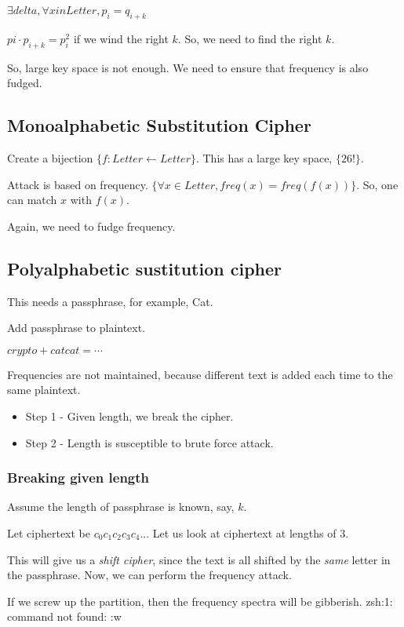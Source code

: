 ${ \exists delta, \forall x in Letter, p_i = q_{i+k} }$

${ pi \cdot p_{i+ k} = p_i ^ 2 }$ if we wind the right $k$. So, we need to find
the right $k$.

So, large key space is not enough.  We need to ensure that frequency is also fudged.


\subsection{Monoalphabetic Substitution Cipher}

Create a bijection $\{ f : Letter \leftarrow Letter \}$.
This has a large key space, $\{ 26! \}$.


Attack is based on frequency. $\{ \forall x \in Letter, freq(x) = freq(f(x)) \}$.
So, one can match $x$ with $f(x)$.

Again, we need to fudge frequency.

\subsection{Polyalphabetic sustitution cipher}

This needs a passphrase, for example, Cat.

Add passphrase to plaintext.

${c r y p t o + c a t c a t = \cdots }$

Frequencies are not maintained, because different text is added each time
to the same plaintext.

\begin{itemize}
    \item Step 1 - Given length, we break the cipher.
    \item Step 2 - Length is susceptible to brute force attack.
\end{itemize}

\subsubsection{Breaking given length}
Assume the length of passphrase is known, say, $k$.

Let ciphertext be $c_0 c_1 c_2 c_3 c_4 ..$.  Let us look at ciphertext at
lengths of 3.

This will give us a \textit{shift cipher}, since the text is all shifted by the
\textit{same} letter in the passphrase. Now, we can perform the frequency
attack.

If we screw up the partition, then the frequency spectra will be gibberish.
zsh:1: command not found: :w

